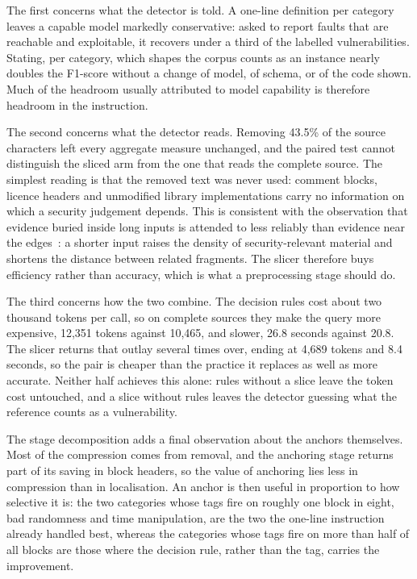 \documentclass{ieeeaccess}
\begin{document}
The first concerns what the detector is told. A one-line definition per category leaves a capable model markedly conservative: asked to report faults that are reachable and exploitable, it recovers under a third of the labelled vulnerabilities. Stating, per category, which shapes the corpus counts as an instance nearly doubles the F1-score without a change of model, of schema, or of the code shown. Much of the headroom usually attributed to model capability is therefore headroom in the instruction.

The second concerns what the detector reads. Removing 43.5\% of the source characters left every aggregate measure unchanged, and the paired test cannot distinguish the sliced arm from the one that reads the complete source. The simplest reading is that the removed text was never used: comment blocks, licence headers and unmodified library implementations carry no information on which a security judgement depends. This is consistent with the observation that evidence buried inside long inputs is attended to less reliably than evidence near the edges~\cite{liu2024lost}: a shorter input raises the density of security-relevant material and shortens the distance between related fragments. The slicer therefore buys efficiency rather than accuracy, which is what a preprocessing stage should do.

The third concerns how the two combine. The decision rules cost about two thousand tokens per call, so on complete sources they make the query more expensive, 12,351 tokens against 10,465, and slower, 26.8 seconds against 20.8. The slicer returns that outlay several times over, ending at 4,689 tokens and 8.4 seconds, so the pair is cheaper than the practice it replaces as well as more accurate. Neither half achieves this alone: rules without a slice leave the token cost untouched, and a slice without rules leaves the detector guessing what the reference counts as a vulnerability.

The stage decomposition adds a final observation about the anchors themselves. Most of the compression comes from removal, and the anchoring stage returns part of its saving in block headers, so the value of anchoring lies less in compression than in localisation. An anchor is then useful in proportion to how selective it is: the two categories whose tags fire on roughly one block in eight, bad randomness and time manipulation, are the two the one-line instruction already handled best, whereas the categories whose tags fire on more than half of all blocks are those where the decision rule, rather than the tag, carries the improvement.
\end{document}
